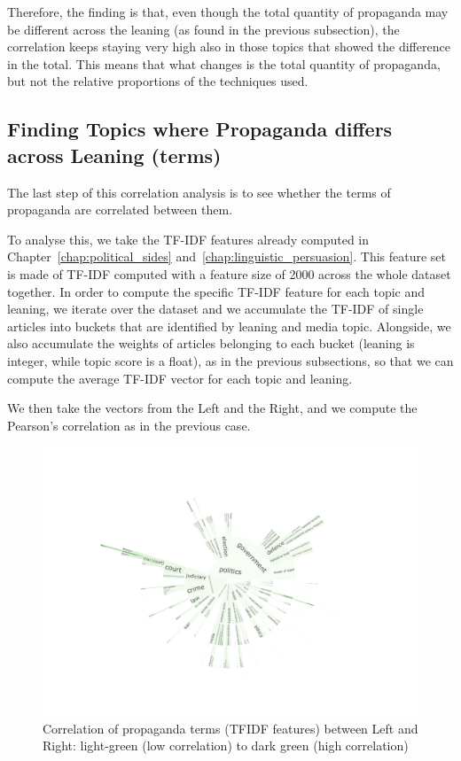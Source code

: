Therefore, the finding is that, even though the total quantity of propaganda may be different across the leaning (as found in the previous subsection), the correlation keeps staying very high also in those topics that showed the difference in the total.
This means that what changes is the total quantity of propaganda, but not the relative proportions of the techniques used.

\subsection{\statusgreen Finding Topics where Propaganda differs across Leaning (terms)}
\label{ssec:topic_propaganda_leaning_terms}

The last step of this correlation analysis is to see whether the terms of propaganda are correlated between them.

To analyse this, we take the TF-IDF features already computed in Chapter~\ref{chap:political_sides} and~\ref{chap:linguistic_persuasion}.
This feature set is made of TF-IDF computed with a feature size of 2000 across the whole dataset together.
In order to compute the specific TF-IDF feature for each topic and leaning, we iterate over the dataset and we accumulate the TF-IDF of single articles into buckets that are identified by leaning and media topic.
Alongside, we also accumulate the weights of articles belonging to each bucket (leaning is integer, while topic score is a float), as in the previous subsections, so that we can compute the average TF-IDF vector for each topic and leaning.

We then take the vectors from the Left and the Right, and we compute the Pearson's correlation as in the previous case.

\begin{figure}[!htbp]
    \centering
    \includegraphics[trim={2.2cm 2cm 2.2cm 2cm},clip,width=\linewidth]{figures/baly_iptc_weighted_prop_leaning_corr_tfidf.pdf}
    \caption{Correlation of propaganda terms (TFIDF features) between Left and Right: light-green (low correlation) to dark green (high correlation)}
    \label{fig:baly_iptc_weighted_prop_leaning_corr_tfidf}
\end{figure}

